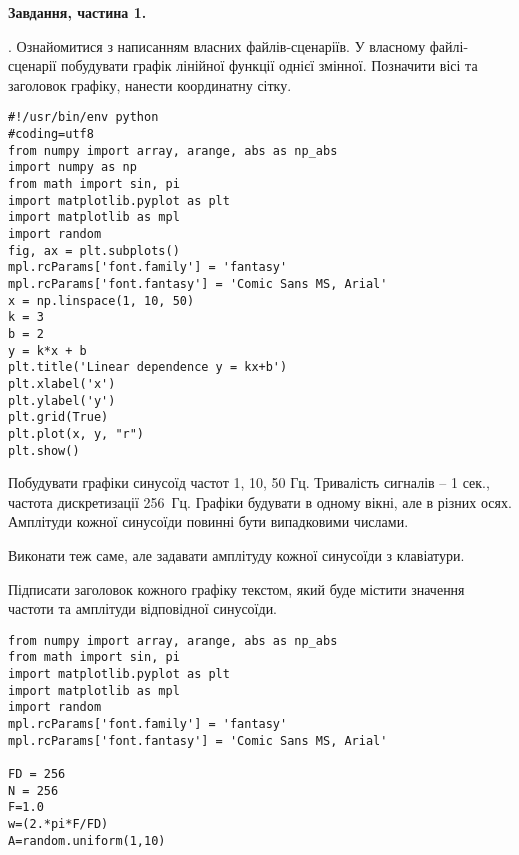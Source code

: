 \documentclass[a4paper,12pt]{article}
\begin{document}
\textbf{Завдання, частина 1.}\par
{}. Ознайомитися з написанням власних файлів-сценаріїв. У власному файлі-сценарії побудувати графік лінійної функції однієї змінної. Позначити вісі та заголовок графіку, нанести координатну сітку.\par
\lstset{language=Python}          %
\begin{lstlisting}    
#!/usr/bin/env python
#coding=utf8
from numpy import array, arange, abs as np_abs
import numpy as np
from math import sin, pi
import matplotlib.pyplot as plt
import matplotlib as mpl
import random
fig, ax = plt.subplots()
mpl.rcParams['font.family'] = 'fantasy'
mpl.rcParams['font.fantasy'] = 'Comic Sans MS, Arial'
x = np.linspace(1, 10, 50)
k = 3
b = 2
y = k*x + b
plt.title('Linear dependence y = kx+b') 
plt.xlabel('x')
plt.ylabel('y')
plt.grid(True)
plt.plot(x, y, "r")  
plt.show()
\end{lstlisting}
\vspace{1cm}\par
{} Побудувати графіки синусоїд частот 1, 10, 50 Гц. Тривалість сигналів – 1 сек., частота дискретизації 256 Гц. Графіки будувати в одному вікні, але в різних осях. Амплітуди кожної синусоїди повинні бути випадковими числами.\par
{} Виконати теж саме, але  задавати амплітуду кожної синусоїди з клавіатури.\par
{} Підписати заголовок кожного графіку текстом, який буде містити значення частоти та амплітуди відповідної синусоїди.\par
\lstset{language=Python}          %
\begin{lstlisting}    
from numpy import array, arange, abs as np_abs
from math import sin, pi
import matplotlib.pyplot as plt
import matplotlib as mpl
import random
mpl.rcParams['font.family'] = 'fantasy'
mpl.rcParams['font.fantasy'] = 'Comic Sans MS, Arial'

FD = 256
N = 256
F=1.0
w=(2.*pi*F/FD)
A=random.uniform(1,10)
\end{lstlisting}
\lstset{language=Python}
\end{document}
